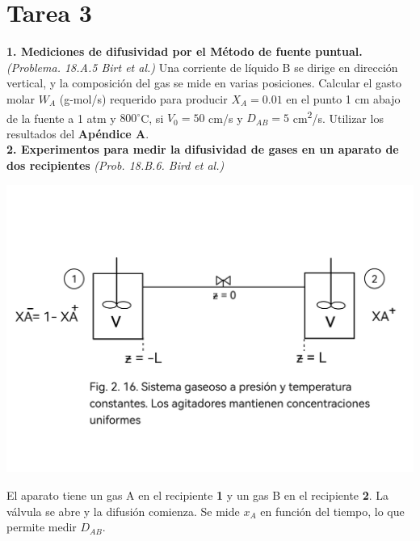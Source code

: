 \section*{Tarea 3}
\vspace{0.3cm} %
\flushleft
\textbf{1. Mediciones de difusividad por el Método de fuente puntual.}\textit{(Problema. 18.A.5 Birt et al.)}
\vspace{0.1cm} %
\flushleft
Una corriente de líquido B se dirige en dirección vertical, y la composición del gas se mide en varias posiciones. Calcular el gasto molar $W_A$ (g-mol/s) requerido para producir $X_A = 0.01$ en el punto 1 cm abajo de la fuente a 1 atm y $800^\circ$C, si $V_0 = 50$ cm/s y $D_{AB} = 5$ cm\textsuperscript{2}/s. 
\vspace{0.1cm} %
\flushleft
Utilizar los resultados del \textbf{Apéndice A}.\\
\flushleft
\textbf{2. Experimentos para medir la difusividad de gases en un aparato de dos recipientes} \textit{(Prob. 18.B.6. Bird et al.)} 
\flushleft
\begin{minipage}{0.5\textwidth} %
    \includegraphics[width=\linewidth]{./Capitulo2/Imagenes/imagen-4.jpg} %
\end{minipage}
\hfill %
\begin{minipage}{0.45\textwidth} %
El aparato tiene un gas A en el recipiente \textbf{1} y un gas B en el recipiente \textbf{2}.  La válvula se abre y la difusión comienza.  Se mide $x_A$ en función del tiempo, lo que permite medir $D_{AB}$.
\end{minipage}

